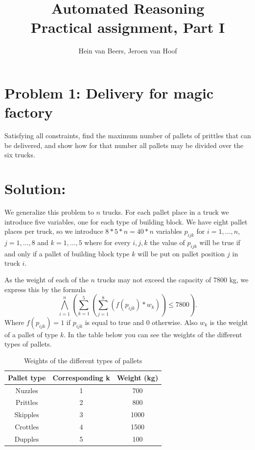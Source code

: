 \documentclass[a4paper]{article}
\author{Hein van Beers, Jeroen van Hoof}
\title{Automated Reasoning\\
	 \large Practical assignment, Part I}
\begin{document}
	\maketitle
	
	\section*{Problem 1: Delivery for magic factory}
	Satisfying all constraints, find the maximum number of pallets of prittles that can be delivered, and show how for that number all pallets may be divided over the six trucks.

	
	\section*{Solution:}
	We generalize this problem to $n$ trucks. For each pallet place in a truck we introduce five variables, one for each type of building block. We have eight pallet places per truck, so we introduce $8*5*n = 40*n$ variables $p_{ijk}$ for $i = 1,\ldots,n$, $j = 1,\ldots,8$ and $k = 1,\ldots,5$ where for every $i,j,k$ the value of $p_{ijk}$ will be true if and only if a pallet of building block type $k$ will be put on pallet position $j$ in truck $i$.
	
	As the weight of each of the $n$ trucks may not exceed the capacity of 7800 kg, we express this by the formula
\[ \bigwedge_{i=1}^n (\sum_{k=1}^5 (\sum_{j=1}^8 (f(p_{ijk})*w_k)) \leq 7800).\]
Where $f(p_{ijk}) = 1$ if $p_{ijk}$ is equal to true and 0 otherwise. Also $w_k$ is the weight of a pallet of type $k$. In the table below you can see the weights of the different types of pallets.

\begin{table}[H]
\centering
\caption{Weights of the different types of pallets}
\label{my-label}
\begin{tabular}{c|c|c}
\textbf{Pallet type} & \textbf{Corresponding k} & \textbf{Weight (kg)} \\ \hline
Nuzzles              & 1                        & 700                  \\ \hline
Prittles             & 2                        & 800                  \\ \hline
Skipples             & 3                        & 1000                 \\ \hline
Crottles             & 4                        & 1500                 \\ \hline
Dupples              & 5                        & 100                 
\end{tabular}
\end{table}
\end{document}
